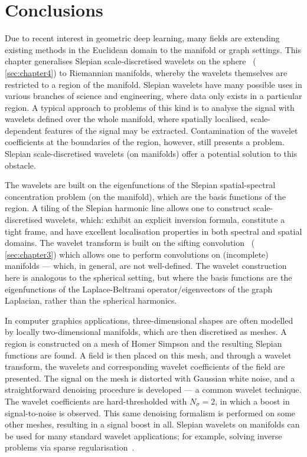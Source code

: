 





\section{Conclusions}\label{sec:chapter5_conclusions}

Due to recent interest in geometric deep learning, many fields are extending existing methods in the Euclidean domain to the manifold or graph settings.
This chapter generalises Slepian scale-discretised wavelets on the sphere~\cite{Roddy2022} (\cf{} \cref{sec:chapter4}) to Riemannian manifolds, whereby the wavelets themselves are restricted to a region of the manifold.
Slepian wavelets have many possible uses in various branches of science and engineering, where data only exists in a particular region.
A typical approach to problems of this kind is to analyse the signal with wavelets defined over the whole manifold, where spatially localised, scale-dependent features of the signal may be extracted.
Contamination of the wavelet coefficients at the boundaries of the region, however, still presents a problem.
Slepian scale-discretised wavelets (on manifolds) offer a potential solution to this obstacle.

The wavelets are built on the eigenfunctions of the Slepian spatial-spectral concentration problem (on the manifold), which are the basis functions of the region.
A tiling of the Slepian harmonic line allows one to construct scale-discretised wavelets, which: exhibit an explicit inversion formula, constitute a tight frame, and have excellent localisation properties in both spectral and spatial domains.
The wavelet transform is built on the sifting convolution~\cite{Roddy2021} (\cf{} \cref{sec:chapter3}) which allows one to perform convolutions on (incomplete) manifolds --- which, in general, are not well-defined.
The wavelet construction here is analogous to the spherical setting, but where the basis functions are the eigenfunctions of the Laplace-Beltrami operator/eigenvectors of the graph Laplacian, rather than the spherical harmonics.

In computer graphics applications, three-dimensional shapes are often modelled by locally two-dimensional manifolds, which are then discretised as meshes.
A region is constructed on a mesh of Homer Simpson and the resulting Slepian functions are found.
A field is then placed on this mesh, and through a wavelet transform, the wavelets and corresponding wavelet coefficients of the field are presented.
The signal on the mesh is distorted with Gaussian white noise, and a straightforward denoising procedure is developed --- a common wavelet technique.
The wavelet coefficients are hard-thresholded with \(N_{\sigma}=2\), in which a boost in signal-to-noise is observed.
This same denoising formalism is performed on some other meshes, resulting in a signal boost in all.
Slepian wavelets on manifolds can be used for many standard wavelet applications; for example, solving inverse problems via sparse regularisation~\cite{McEwen2013a,Wallis2017,Price2021}.
